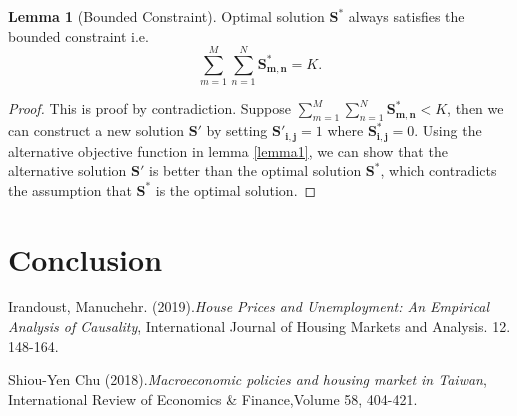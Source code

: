 \documentclass[12pt]{article}
\theoremstyle{definition}
\newtheorem{lemma}[theorem]{Lemma}
\newcommand{\matr}[1]{\mathbf{#1}} %
\begin{document}
\begin{sloppypar}
\begin{lemma}[Bounded Constraint]\label{lemma2}
    Optimal solution $\matr{S^*}$ always satisfies the bounded constraint i.e.
    \begin{equation*}
        \sum_{m=1}^{M}\sum_{n=1}^{N}\matr{S^*_{m,n}} = K.
    \end{equation*}
\end{lemma}
\begin{proof}
    This is proof by contradiction. Suppose $\sum_{m=1}^{M}\sum_{n=1}^{N}\matr{S^*_{m,n}} < K$, then we can construct a new solution $\matr{S'}$ by setting $\matr{S'_{i,j}} = 1$ where $\matr{S^*_{i,j}} = 0$. Using the alternative objective function in lemma \ref{lemma1}, we can show that the alternative solution $\matr{S'}$ is better than the optimal solution $\matr{S^*}$, which contradicts the assumption that $\matr{S^*}$ is the optimal solution.
\end{proof}


\section{Conclusion}

\begin{thebibliography}{1}
    Irandoust, Manuchehr. (2019).\emph{House Prices and Unemployment: An Empirical Analysis of Causality},
    International Journal of Housing Markets and Analysis. 12. 148-164. 

    Shiou-Yen Chu (2018).\emph{Macroeconomic policies and housing market in Taiwan},
    International Review of Economics \& Finance,Volume 58, 404-421.
\end{thebibliography}


\end{sloppypar}
\end{document}

